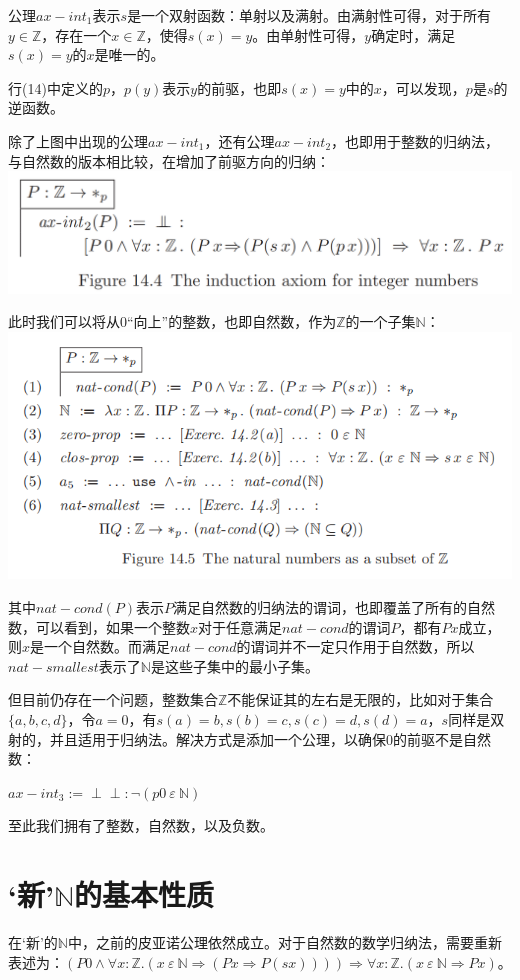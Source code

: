 \documentclass[UTF8]{article}
\newcommand{\dperp}{\perp\!\!\!\perp}
\begin{document}
		公理$ax{-}int_1$表示$s$是一个双射函数：单射以及满射。由满射性可得，对于所有$y\in\mathbb{Z}$，存在一个$x\in\mathbb{Z}$，使得$s(x)=y$。由单射性可得，$y$确定时，满足$s(x)=y$的$x$是唯一的。
		
		行(14)中定义的$p$，$p(y)$表示$y$的前驱，也即$s(x)=y$中的$x$，可以发现，$p$是$s$的逆函数。
		
		除了上图中出现的公理$ax{-}int_1$，还有公理$ax{-}int_2$，也即用于整数的归纳法，与自然数的版本相比较，在增加了前驱方向的归纳：\\
		\includegraphics[width=0.93\linewidth]{"../imgs/14-2.png"}
		
		此时我们可以将从0“向上”的整数，也即自然数，作为$\mathbb{Z}$的一个子集$\mathbb{N}$：\\
		\includegraphics[width=0.93\linewidth]{"../imgs/14-3.png"}
		
		其中$nat{-}cond(P)$表示$P$满足自然数的归纳法的谓词，也即覆盖了所有的自然数，可以看到，如果一个整数$x$对于任意满足$nat{-}cond$的谓词$P$，都有$Px$成立，则$x$是一个自然数。而满足$nat{-}cond$的谓词并不一定只作用于自然数，所以$nat{-}smallest$表示了$\mathbb{N}$是这些子集中的最小子集。
		
		但目前仍存在一个问题，整数集合$\mathbb{Z}$不能保证其的左右是无限的，比如对于集合$\{a,b,c,d\}$，令$a=0$，有$s(a)=b,s(b)=c,s(c)=d,s(d)=a$，$s$同样是双射的，并且适用于归纳法。解决方式是添加一个公理，以确保0的前驱不是自然数：
		
		$ax{-}int_3:=\dperp:\neg(p0\ \varepsilon\ \mathbb{N})$
		
		至此我们拥有了整数，自然数，以及负数。
		
	\section{`新'$\mathbb{N}$的基本性质}
	\noindent
	在`新'的$\mathbb{N}$中，之前的皮亚诺公理依然成立。对于自然数的数学归纳法，需要重新表述为：$(P0\land\forall x:\mathbb{Z}.(x\ \varepsilon\ \mathbb{N}\Rightarrow(Px\Rightarrow P(sx))))\Rightarrow\forall x:\mathbb{Z}.(x\ \varepsilon\ \mathbb{N}\Rightarrow Px)$。
		
\end{document}
